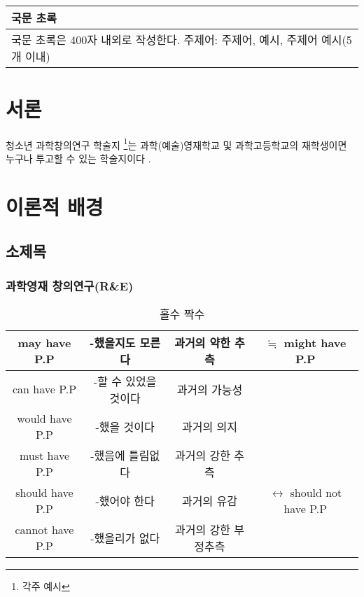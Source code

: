 \documentclass[10pt]{article}
\begin{document}
\begin{center}
	\fontsize{16pt}{16pt}\selectfont{\bf R\&E 과제명(국문)}\\
	\vspace{0.25cm}
	\fontsize{10pt}{10pt}\selectfont{ 저자명\textperiodcentered  저자명 \\}
	\fontsize{9pt}{9pt}\selectfont{ 과학영재학교 공동과학고등학교 \\}
	\vspace{0.6cm}
	\fontsize{16pt}{16pt}\selectfont{\bf Title(English) \\}
	\vspace{0.25cm}
	\fontsize{10pt}{10pt}\selectfont{ author name\textperiodcentered  author name \\}
	\fontsize{9pt}{9pt}\selectfont{ Gongdong Science High School for the Gifted\\}
\end{center}
\begin{table}[h]
	\begin{tabular}{p{\textwidth}}
		{\centering \large \bf \hspace{7.6cm} 국문 초록} \\
		\hline
		국문 초록은 400자 내외로 작성한다. 주제어: 주제어, 예시, 주제어 예시(5개 이내) \\
		\hline
	\end{tabular}
\end{table}
\section{서론}
청소년 과학창의연구 학술지 \footnote{각주 예시}는 과학(예술)영재학교 및 과학고등학교의 재학생이면 누구나 투고할 수 있는 학술지이다 \cite{song}.
\section{이론적 배경}
\subsection{소제목}
\subsubsection{과학영재 창의연구(R\&E)}
\lipsum[1]
\begin{table}[h]
	\centering
	\caption{홀수 짝수}
	\label{oddeven}
	\begin{tabular}{|c||c|c|c|}
		\hline
		may have P.P & -했을지도 모른다 & 과거의 약한 추측 & $\fallingdotseq$ might have P.P\\
		\hline
		can have P.P & -할 수 있었을 것이다 & 과거의 가능성 & \\
		\hline
		would have P.P & -했을 것이다 & 과거의 의지 & \\
		\hline
		must have P.P & -했음에 틀림없다 & 과거의 강한 추측 & \\
		\hline
		should have P.P & -했어야 한다 & 과거의 유감 & $\longleftrightarrow$ should not have P.P \\
		\hline
		cannot have P.P & -했을리가 없다 & 과거의 강한 부정추측 & \\
		\hline
	\end{tabular}
\end{table}
\end{document}

